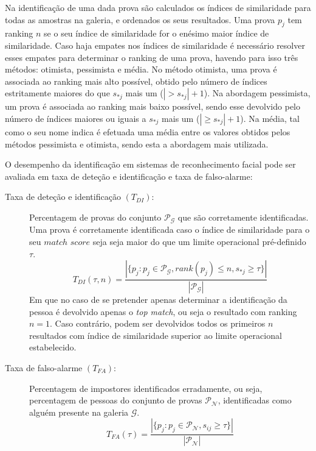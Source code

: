 Na identificação de uma dada prova são calculados os índices de similaridade para todas as amostras na galeria, e ordenados os seus resultados. Uma prova $p_j$ tem ranking $n$ se o seu índice de similaridade for o enésimo maior índice de similaridade. Caso haja empates nos índices de similaridade é necessário resolver esses empates para determinar o ranking de uma prova, havendo para isso três métodos: otimista, pessimista e média. No método otimista, uma prova é associada ao ranking mais alto possível, obtido pelo número de índices estritamente maiores do que $s_{*j}$ mais um ($|> s_{*j}| + 1$). Na abordagem pessimista, um prova é associada ao ranking mais baixo possível, sendo esse devolvido pelo número de índices maiores ou iguais a $s_{*j}$ mais um ($|\geqslant s_{*j}| + 1$). Na média, tal como o seu nome indica é efetuada uma média entre os valores obtidos pelos métodos pessimista e otimista, sendo esta a abordagem mais utilizada. 

O desempenho da identificação em sistemas de reconhecimento facial pode ser avaliada em taxa de deteção e identificação e taxa de falso-alarme:

 \begin{description}
 \item[Taxa de deteção e identificação $(T_{DI})$:] Percentagem de provas do conjunto $\mathscr{P}_\mathscr{G}$ que são corretamente  identificadas. Uma prova é corretamente identificada caso o índice de similaridade para o seu $match$ $score$ seja seja maior do que um limite operacional pré-definido $\tau$.
\begin{equation}
 T_{DI}(\tau, n) = \frac{|\{p_j:p_j \in \mathscr{P}_\mathscr{G}, rank(p_j) \leqslant n, s_{*j} \geqslant \tau\}|}{|\mathscr{P}_\mathscr{G}|}
\end{equation}
 Em que no caso de se pretender apenas determinar a identificação da pessoa é devolvido apenas o \textit{top match}, ou seja o resultado com ranking $n=1$. Caso contrário, podem ser devolvidos todos os primeiros $n$ resultados com índice de similaridade superior ao limite operacional estabelecido.
 
  \item[Taxa de falso-alarme $(T_{FA})$:] Percentagem de impostores identificados erradamente, ou seja, percentagem de pessoas do conjunto de provas $\mathscr{P}_\mathscr{N}$, identificadas como alguém presente na galeria $\mathscr{G}$.  
\begin{equation}
 T_{FA}(\tau) = \frac{|\{p_j:p_j \in \mathscr{P}_\mathscr{N}, s_{ij} \geqslant \tau\}|}{|\mathscr{P}_\mathscr{N}|}
\end{equation}
\end{description}

